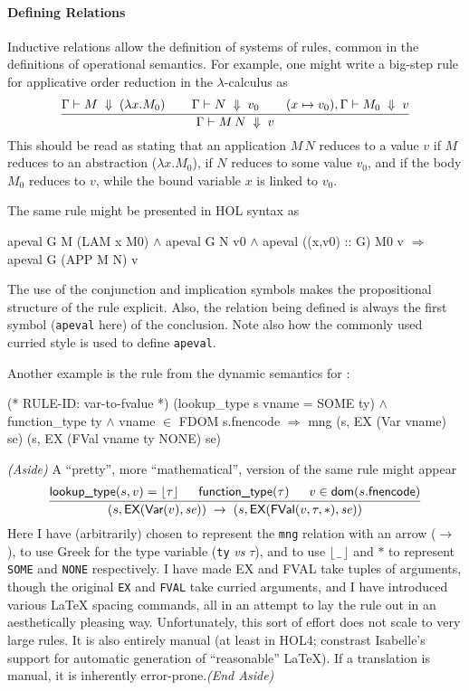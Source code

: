 \documentclass[11pt]{article}
\begin{document}
\paragraph{Defining Relations}
Inductive relations allow the definition of systems of rules, common
in the definitions of operational semantics.  For example, one might
write a big-step rule for applicative order reduction in the
$\lambda$-calculus as
\[
\infer{\Gamma \vdash M\,N\;\Downarrow \;v}{\Gamma \vdash M \;\Downarrow\; (\lambda x. M_0) \;\;&
  \;\;\Gamma \vdash N \;\Downarrow\;v_0\;\; & \;\;(x\mapsto v_0),\Gamma \vdash M_0 \;\Downarrow\; v}
\]
This should be read as stating that an application $M\,N$ reduces to a
value $v$ if $M$ reduces to an abstraction ($\lambda x. M_0$), if $N$
reduces to some value $v_0$, and if the body $M_0$ reduces to $v$,
while the bound variable $x$ is linked to $v_0$.

The same rule might be presented in HOL syntax as
\begin{stdrule}
     apeval G M (LAM x M0) \(\land\)
     apeval G N v0 \(\land\)
     apeval ((x,v0) :: G) M0 v
   \(\Rightarrow\)
     apeval G (APP M N) v
\end{stdrule}
The use of the conjunction and implication symbols makes the
propositional structure of the rule explicit.  Also, the relation
being defined is always the first symbol (\texttt{apeval} here) of the
conclusion.  Note also how the commonly used curried style is used to
define \texttt{apeval}.

Another example is the rule  from the dynamic
semantics for \cpp{}:
\begin{stdrule}
(* RULE-ID: var-to-fvalue *)
     (lookup_type s vname = SOME ty) \(\land\)
     function_type ty \(\land\)
     vname \(\in\) FDOM s.fnencode
   \(\Rightarrow\)
     mng (s, EX (Var vname) se) (s, EX (FVal vname ty NONE) se)
\end{stdrule}
\textit{(Aside)} A ``pretty'', more ``mathematical'', version of the same rule might
appear
\[
\infer{(s,\textsf{EX}(\textsf{Var}(v),\mathit{se})) \;\rightarrow\;
       (s,\textsf{EX}(\textsf{FVal}(v,\tau,*),\mathit{se}))}{
       \textsf{lookup\_type}(s,v) = \lfloor\tau\rfloor \;&\;
       \textsf{function\_type}(\tau) \;&\;
       v \in \textsf{dom}(s.\textsf{fnencode})}
\]
Here I have (arbitrarily) chosen to represent the \texttt{mng}
relation with an arrow ($\rightarrow$), to use Greek for the type
variable (\texttt{ty} \textit{vs} $\tau$), and to use
$\lfloor\,\_\,\rfloor$ and $*$ to represent \texttt{SOME} and
\texttt{NONE} respectively.  I have made \textsf{EX} and \textsf{FVAL}
take tuples of arguments, though the original \texttt{EX} and
\texttt{FVAL} take curried arguments, and I have introduced various
\LaTeX{} spacing commands, all in an attempt to lay the rule out in an
aesthetically pleasing way.  Unfortunately, this sort of effort does
not scale to very large rules. It is also entirely manual (at least in
HOL4; constrast Isabelle's support for automatic generation of
``reasonable'' \LaTeX).  If a translation is manual, it is inherently
error-prone.\hfill{\textit{(End Aside)}}
\end{document}
